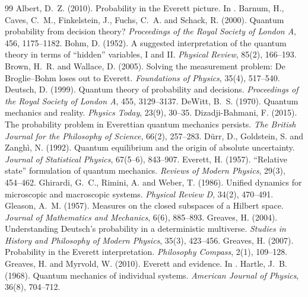 \documentclass{situationist-preprint}
\begin{document}
\begin{thebibliography}{99}\small
{} Albert, D.~Z. (2010). Probability in the Everett picture. In \citet{Saunders2010}.
 Barnum, H., Caves, C.~M., Finkelstein, J., Fuchs, C.~A. and Schack, R. (2000). Quantum probability from decision theory? \emph{Proceedings of the Royal Society of London A}, 456, 1175--1182.
 Bohm, D. (1952). A suggested interpretation of the quantum theory in terms of ``hidden'' variables, I and II. \emph{Physical Review}, 85(2), 166--193.
 Brown, H.~R. and Wallace, D. (2005). Solving the measurement problem: De Broglie--Bohm loses out to Everett. \emph{Foundations of Physics}, 35(4), 517--540.
 Deutsch, D. (1999). Quantum theory of probability and decisions. \emph{Proceedings of the Royal Society of London A}, 455, 3129--3137.
 DeWitt, B.~S. (1970). Quantum mechanics and reality. \emph{Physics Today}, 23(9), 30--35.
 Dizadji-Bahmani, F. (2015). The probability problem in Everettian quantum mechanics persists. \emph{The British Journal for the Philosophy of Science}, 66(2), 257--283.
 Dürr, D., Goldstein, S. and Zanghì, N. (1992). Quantum equilibrium and the origin of absolute uncertainty. \emph{Journal of Statistical Physics}, 67(5--6), 843--907.
 Everett, H. (1957). ``Relative state'' formulation of quantum mechanics. \emph{Reviews of Modern Physics}, 29(3), 454--462.
 Ghirardi, G.~C., Rimini, A. and Weber, T. (1986). Unified dynamics for microscopic and macroscopic systems. \emph{Physical Review D}, 34(2), 470--491.
 Gleason, A.~M. (1957). Measures on the closed subspaces of a Hilbert space. \emph{Journal of Mathematics and Mechanics}, 6(6), 885--893.
 Greaves, H. (2004). Understanding Deutsch's probability in a deterministic multiverse. \emph{Studies in History and Philosophy of Modern Physics}, 35(3), 423--456.
 Greaves, H. (2007). Probability in the Everett interpretation. \emph{Philosophy Compass}, 2(1), 109--128.
 Greaves, H. and Myrvold, W. (2010). Everett and evidence. In \citet{Saunders2010}.
 Hartle, J.~B. (1968). Quantum mechanics of individual systems. \emph{American Journal of Physics}, 36(8), 704--712.

\end{thebibliography}
\end{document}
